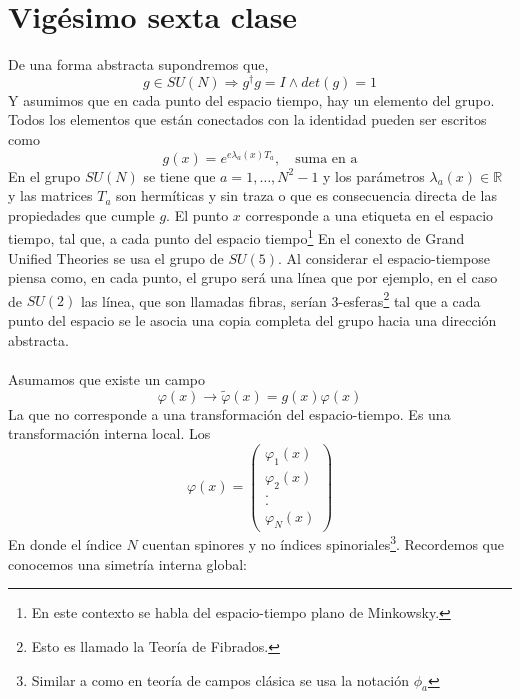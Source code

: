 \documentclass[../main.tex]{subfiles}
\begin{document}
\section{Vigésimo sexta clase}
De una forma abstracta supondremos que,
\begin{equation}
  g\in SU(N) \Rightarrow g^\dagger g = I \wedge det(g) = 1
 \end{equation}
 Y asumimos que en cada punto del espacio tiempo, hay un elemento del grupo. Todos los elementos que están conectados con la identidad pueden ser escritos como
 \begin{equation}
   g(x) = e^{e\lambda_a(x)T_a}, \quad \text{suma en a}
  \end{equation}
En el grupo $SU(N)$ se tiene que $a=1,\dots,N^2-1$ y los parámetros $\lambda_a(x)\in\mathbb{R}$ y las matrices $T_a$ son hermíticas y sin traza o que es consecuencia directa de las propiedades que cumple $g$. El punto $x$ corresponde a una etiqueta en el espacio tiempo, tal que, a cada punto del espacio tiempo\footnote{En este contexto se habla del espacio-tiempo plano de Minkowsky.} En el conexto de Grand Unified Theories se usa el grupo de $SU(5)$. Al considerar el espacio-tiempose piensa como, en cada punto, el grupo será una línea que por ejemplo, en el caso de $SU(2)$ las línea, que son llamadas fibras, serían 3-esferas\footnote{Esto es llamado la Teoría de Fibrados.} tal que a cada punto del espacio se le asocia una copia completa del grupo hacia una dirección abstracta. \\
\\
Asumamos que existe un campo
\begin{equation}
  \varphi(x) \longrightarrow \tilde{\varphi}(x) = g(x) \varphi(x)
 \end{equation}
 La que no corresponde a una transformación del espacio-tiempo. Es una transformación interna local. Los
 \begin{equation*}
   \varphi(x) = \begin{pmatrix}
     \varphi_1(x) \\
     \varphi_2(x) \\
     .\\
     .\\
     \varphi_N(x)
   \end{pmatrix}
 \end{equation*}
En donde el índice $N$ cuentan spinores y no índices spinoriales\footnote{Similar a como en teoría de campos clásica se usa la notación $\phi_a$}. Recordemos que conocemos una simetría interna global:
\end{document}

